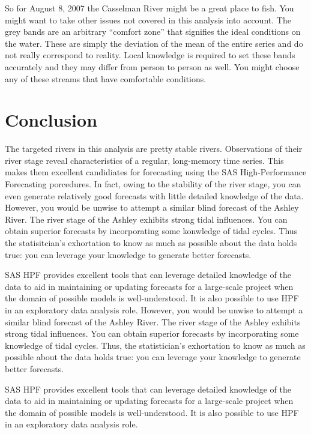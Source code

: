 \documentclass[10pt]{sugconf-ish}
\begin{document}
So for August 8, 2007 the Casselman River might be a great place to fish.  You might want to take other issues not covered in this analysis into account.  The grey bands are an arbitrary ``comfort zone'' that signifies the ideal conditions on the water.  These are simply the deviation of the mean of the entire series and do not really correspond to reality.  Local knowledge is required to set these bands accurately and they may differ from person to person as well.  You might choose any of these streams that have comfortable conditions. 

\section{Conclusion}
The targeted rivers in this analysis are pretty stable rivers.  Observations of their river stage reveal characteristics of a regular, long-memory time series.  This makes them excellent candidiates for forecasting using the SAS High-Performance Forecasting porcedures.  In fact, owing to the stability of the river stage, you can even generate relatively good forecasts with little detailed knowledge of the data.  However, you would be unwise to attempt a similar blind forecast of the Ashley River.  The river stage of the Ashley exhibits strong tidal influences.  You can obtain superior forecasts by incorporating some konwledge of tidal cycles.  Thus the statisitcian's exhortation to know as much as possible about the data holds true: you can leverage your knowledge to generate better forecasts. 

SAS HPF provides excellent tools that can leverage detailed knowledge of the data to aid in maintaining or updating forecasts for a large-scale project when the domain of possible models is well-understood. It is also possible to use HPF in an exploratory data analysis role. However, you would be unwise to attempt a similar blind forecast of the Ashley River. The river stage of the Ashley exhibits strong tidal influences. You can obtain superior forecasts by incorporating some knowledge of tidal cycles. Thus, the statistician's exhortation to know as much as possible about the data holds true: you can leverage your knowledge to generate better forecasts. 

SAS HPF provides excellent tools that can leverage detailed knowledge of the data to aid in maintaining or updating forecasts for a large-scale project when the domain of possible models is well-understood. It is also possible to use HPF in an exploratory data analysis role.
\end{document}

